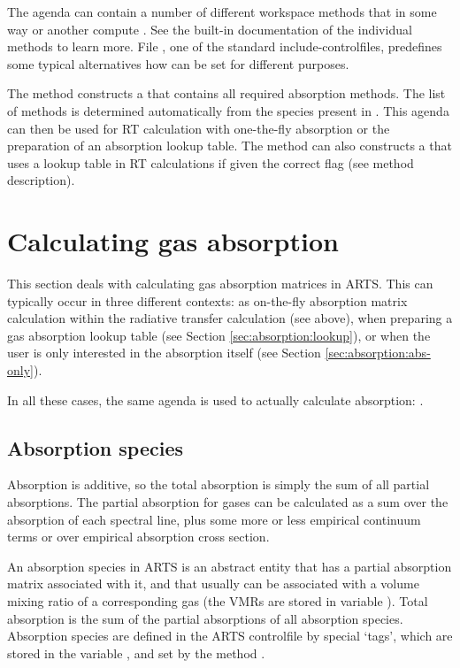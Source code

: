 The agenda can contain a number of different workspace methods that in
some way or another compute . See the
built-in documentation of the individual methods to learn more. File
, one of the standard include-controlfiles,
predefines some typical alternatives how
 can be set for different
purposes.

The method  constructs
a  that contains all required
absorption methods. The list of methods is determined automatically
from the species present in . This agenda can
then be used for RT calculation with one-the-fly absorption or the
preparation of an absorption lookup table. The method
 can also constructs a
 that uses a lookup table in RT
calculations if given the correct flag (see method description).

\section{Calculating gas absorption}
\label{sec:absorption:calculating}

This section deals with calculating gas absorption matrices in ARTS.
This can typically occur in three different contexts: as on-the-fly
absorption matrix calculation within the radiative transfer
calculation (see above), when preparing a gas absorption lookup table
(see Section \ref{sec:absorption:lookup}), or when the user is only
interested in the absorption itself (see Section
\ref{sec:absorption:abs-only}).

In all these cases, the same agenda is used to actually calculate
absorption: .


\subsection{Absorption species}

Absorption is additive, so the total absorption is simply the sum of
all partial absorptions.  The partial absorption for gases can be calculated
as a sum over the absorption of each spectral line, plus some more or less
empirical continuum terms or over empirical absorption cross section.

An absorption species in ARTS is an abstract entity that has a partial
absorption matrix associated with it, and that usually can be
associated with a volume mixing ratio of a corresponding gas (the VMRs
are stored in variable ). Total absorption is the
sum of the partial absorptions of all absorption species. Absorption
species are defined in the ARTS controlfile by special `tags', which
are stored in the variable , and set by the
method .

